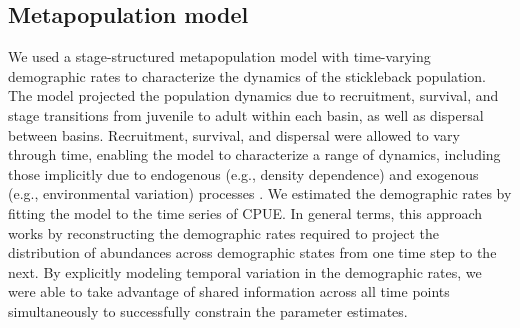 \documentclass[11pt]{article}
\begin{document}
\subsection*{Metapopulation model} 

We used a stage-structured metapopulation model \citep{caswell2001matrix}
with time-varying demographic rates
to characterize the dynamics of the stickleback population. 
The model projected the population dynamics due to 
recruitment, survival, and stage transitions 
from juvenile to adult within each basin,
as well as dispersal between basins. 
Recruitment, survival, and dispersal were allowed to vary through time,
enabling the model to characterize a range of dynamics, 
including those implicitly due to endogenous (e.g., density dependence) 
and exogenous (e.g., environmental variation) processes
\citep{zeng1998, ives2012}. 
We estimated the demographic rates by  
fitting the model to the time series of CPUE. 
In general terms, this approach works by reconstructing the demographic rates required
to project the distribution of abundances across demographic states 
from one time step to the next. 
By explicitly modeling temporal variation in the demographic rates,
we were able to take advantage of shared information across all time points simultaneously 
to successfully constrain the parameter estimates.
\end{document}

